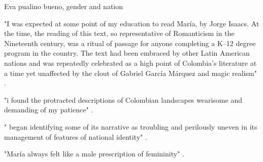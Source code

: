 Eva pualino bueno, gender and nation

"I was expected at some point of my education to read María, by Jorge Isaacs. At the
time, the reading of this text, so representative of Romanticism in the Nineteenth
century, was a ritual of passage for anyone completing a K–12 degree
program in the country. The text had been embraced by other Latin American
nations and was repeatedly celebrated as a high point of Colombia’s literature
at a time yet unaffected by the clout of Gabriel García Márquez and magic
realism" \cite[14]{Bueno2012}.

"i found the protracted descriptions of Colombian landscapes wearisome and demanding of my patience" \cite[14]{Bueno2012}.

"  began identifying
some of its narrative as troubling and perilously uneven in its management of
features of national identity" \cite[15]{Bueno2012}.

"María always felt like a male prescription of femininity" \cite[15]{Bueno2012}.

